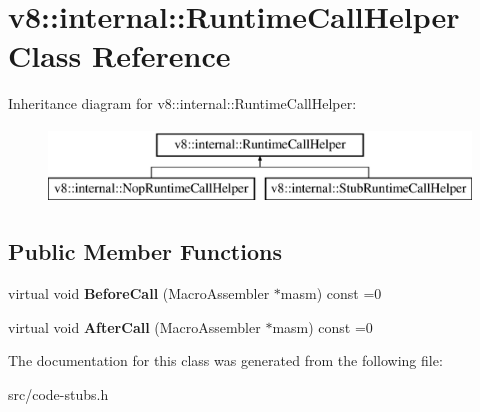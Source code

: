 \hypertarget{classv8_1_1internal_1_1_runtime_call_helper}{}\section{v8\+:\+:internal\+:\+:Runtime\+Call\+Helper Class Reference}
\label{classv8_1_1internal_1_1_runtime_call_helper}
Inheritance diagram for v8\+:\+:internal\+:\+:Runtime\+Call\+Helper\+:\begin{figure}[H]
\begin{center}
\leavevmode
\includegraphics[height=2.000000cm]{classv8_1_1internal_1_1_runtime_call_helper}
\end{center}
\end{figure}
\subsection*{Public Member Functions}
\begin{DoxyCompactItemize}
\item 
\hypertarget{classv8_1_1internal_1_1_runtime_call_helper_a21d0ed8460dc804f5bbad201c754d910}{}virtual void {\bfseries Before\+Call} (Macro\+Assembler $\ast$masm) const =0\label{classv8_1_1internal_1_1_runtime_call_helper_a21d0ed8460dc804f5bbad201c754d910}

\item 
\hypertarget{classv8_1_1internal_1_1_runtime_call_helper_ad81012450b2fd3bf223fb08dd3901277}{}virtual void {\bfseries After\+Call} (Macro\+Assembler $\ast$masm) const =0\label{classv8_1_1internal_1_1_runtime_call_helper_ad81012450b2fd3bf223fb08dd3901277}

\end{DoxyCompactItemize}


The documentation for this class was generated from the following file\+:\begin{DoxyCompactItemize}
\item 
src/code-\/stubs.\+h\end{DoxyCompactItemize}

